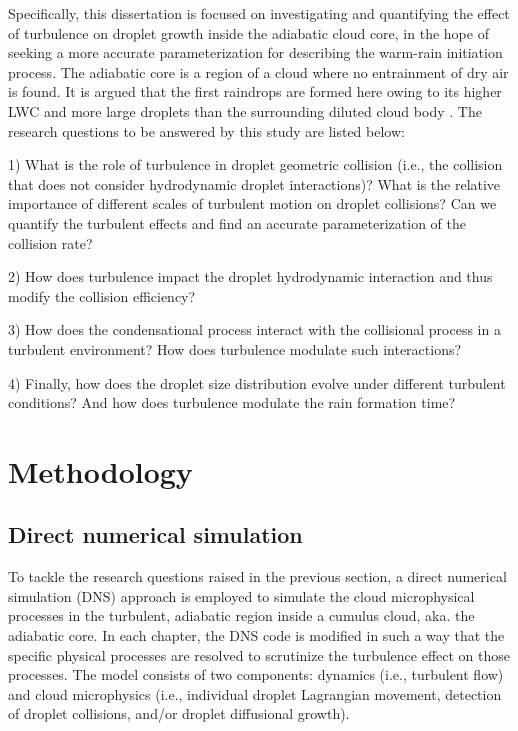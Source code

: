 Specifically, this dissertation is focused on investigating and quantifying the effect of turbulence on droplet growth inside the adiabatic cloud core, in the hope of seeking a more accurate parameterization for describing the warm-rain initiation process. The adiabatic core is a region of a cloud where no entrainment of dry air is found. It is argued that the first raindrops are formed here owing to its higher LWC and more large droplets than the surrounding diluted cloud body \citep{Vaillancourt2001, Khain2013}.  The research questions to be answered by this study are listed below:


1) What is the role of turbulence in droplet geometric collision (i.e., the collision that does not consider hydrodynamic droplet interactions)?  What is the relative importance of different scales of turbulent motion on droplet collisions? Can we quantify the turbulent effects and find an accurate parameterization of the collision rate?

2) How does turbulence impact the droplet hydrodynamic interaction and thus modify the collision efficiency? 

3) How does the condensational process interact with the collisional process in a turbulent environment? How does turbulence modulate such interactions?

4) Finally, how does the droplet size distribution evolve under different turbulent conditions? And how does turbulence modulate the rain formation time?


\section{Methodology}

\subsection{Direct numerical simulation}

To tackle the research questions raised in the previous section, a direct numerical simulation (DNS) approach is employed to simulate the cloud microphysical processes in the turbulent, adiabatic region inside a cumulus cloud, aka. the adiabatic core. In each chapter, the DNS code is modified in such a way that the specific physical processes are resolved to scrutinize the turbulence effect on those processes. The model consists of two components: dynamics (i.e., turbulent flow) and cloud microphysics (i.e., individual droplet Lagrangian movement, detection of droplet collisions, and/or droplet diffusional growth). 


